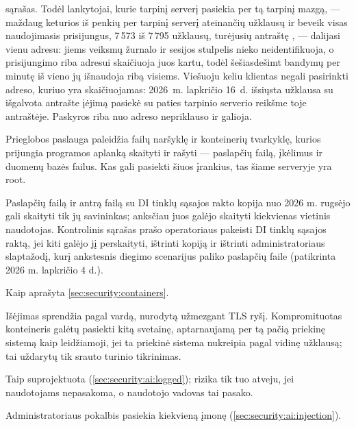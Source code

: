 \begin{description}
    sąrašas. Todėl lankytojai, kurie tarpinį serverį pasiekia per tą tarpinį mazgą, --- maždaug
    keturios iš penkių per tarpinį serverį ateinančių užklausų ir beveik visas naudojimasis
    prisijungus, 7\,573 iš 7\,795 užklausų, turėjusių antraštę , ---
    dalijasi vienu adresu: jiems veiksmų žurnalo ir sesijos stulpelis
     nieko neidentifikuoja, o prisijungimo riba adresui skaičiuoja juos kartu, todėl
    šešiasdešimt bandymų per minutę iš
    vieno jų išnaudoja ribą visiems. Viešuoju keliu klientas negali pasirinkti adreso,
    kuriuo yra skaičiuojamas: 2026~m. lapkričio 16~d. išsiųsta užklausa su išgalvota antrašte
     įėjimą pasiekė su paties tarpinio serverio reikšme toje antraštėje.
    Paskyros riba nuo adreso nepriklauso ir galioja.
  \item[Prieglobos valdymo sluoksniu pasitikima] Prieglobos paslauga paleidžia failų
    naršyklę ir konteinerių tvarkyklę, kurios prijungia programos aplanką skaityti ir rašyti
    --- paslapčių failą, įkėlimus ir duomenų bazės failus. Kas gali
    pasiekti šiuos įrankius, tas šiame serveryje yra root.
  \item[Paslaptys serveryje] Paslapčių failą ir antrą failą su DI tinklų sąsajos rakto kopija
    nuo 2026 m. rugsėjo gali skaityti tik jų savininkas; anksčiau juos galėjo skaityti
    kiekvienas vietinis naudotojas. Kontrolinis sąrašas prašo operatoriaus pakeisti DI tinklų
    sąsajos raktą, jei kiti galėjo jį perskaityti, ištrinti kopiją ir ištrinti
    administratoriaus slaptažodį, kurį ankstesnis diegimo scenarijus paliko paslapčių faile
    (patikrinta 2026 m. lapkričio 4 d.).
  \item[Docker lizdas] Kaip aprašyta \cref{sec:security:containers}.
  \item[Leidžiamų adresų sąrašas pasitiki savo keturiais serveriais] Išėjimas sprendžia pagal
    vardą, nurodytą užmezgant TLS ryšį. Kompromituotas konteineris galėtų pasiekti kitą svetainę,
    aptarnaujamą per tą pačią priekinę sistemą kaip leidžiamoji, jei ta priekinė sistema
    nukreipia pagal vidinę užklausą; tai uždarytų tik srauto turinio tikrinimas.
  \item[Administratoriai skaito pokalbių nuorašus] Taip suprojektuota
    (\cref{sec:security:ai:logged}); rizika tik tuo atveju, jei naudotojams nepasakoma, o
    naudotojo vadovas tai pasako.
  \item[Instrukcijų injekcija tarp įmonių] Administratoriaus pokalbis pasiekia kiekvieną
    įmonę (\cref{sec:security:ai:injection}).

\end{description}
